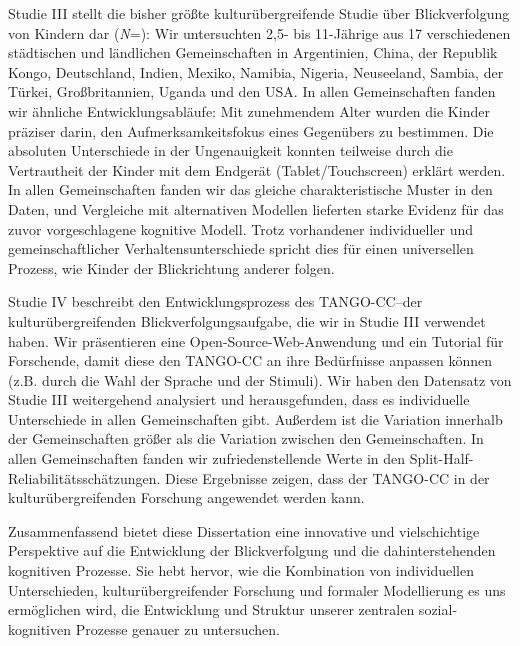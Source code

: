 \documentclass[
]{scrbook}
\begin{document}
Studie III stellt die bisher größte kulturübergreifende Studie über Blickverfolgung von Kindern dar (\emph{N}\thinspace =): Wir untersuchten 2,5- bis 11-Jährige aus 17 verschiedenen städtischen und ländlichen Gemeinschaften in Argentinien, China, der Republik Kongo, Deutschland, Indien, Mexiko, Namibia, Nigeria, Neuseeland, Sambia, der Türkei, Großbritannien, Uganda und den USA. In allen Gemeinschaften fanden wir ähnliche Entwicklungsabläufe: Mit zunehmendem Alter wurden die Kinder präziser darin, den Aufmerksamkeitsfokus eines Gegenübers zu bestimmen. Die absoluten Unterschiede in der Ungenauigkeit konnten teilweise durch die Vertrautheit der Kinder mit dem Endgerät (Tablet/Touchscreen) erklärt werden. In allen Gemeinschaften fanden wir das gleiche charakteristische Muster in den Daten, und Vergleiche mit alternativen Modellen lieferten starke Evidenz für das zuvor vorgeschlagene kognitive Modell. Trotz vorhandener individueller und gemeinschaftlicher Verhaltensunterschiede spricht dies für einen universellen Prozess, wie Kinder der Blickrichtung anderer folgen.

Studie IV beschreibt den Entwicklungsprozess des TANGO-CC\thinspace --\thinspace der kulturübergreifenden Blickverfolgungsaufgabe, die wir in Studie III verwendet haben. Wir präsentieren eine Open-Source-Web-Anwendung und ein Tutorial für Forschende, damit diese den TANGO-CC an ihre Bedürfnisse anpassen können (z.B. durch die Wahl der Sprache und der Stimuli). Wir haben den Datensatz von Studie III weitergehend analysiert und herausgefunden, dass es individuelle Unterschiede in allen Gemeinschaften gibt. Außerdem ist die Variation innerhalb der Gemeinschaften größer als die Variation zwischen den Gemeinschaften. In allen Gemeinschaften fanden wir zufriedenstellende Werte in den Split-Half-Reliabilitätsschätzungen. Diese Ergebnisse zeigen, dass der TANGO-CC in der kulturübergreifenden Forschung angewendet werden kann.

Zusammenfassend bietet diese Dissertation eine innovative und vielschichtige Perspektive auf die Entwicklung der Blickverfolgung und die dahinterstehenden kognitiven Prozesse. Sie hebt hervor, wie die Kombination von individuellen Unterschieden, kulturübergreifender Forschung und formaler Modellierung es uns ermöglichen wird, die Entwicklung und Struktur unserer zentralen sozial-kognitiven Prozesse genauer zu untersuchen.

\renewcommand{\baselinestretch}{1.2}\normalsize
\tableofcontents
\renewcommand{\baselinestretch}{1.5}\normalsize
\end{document}
